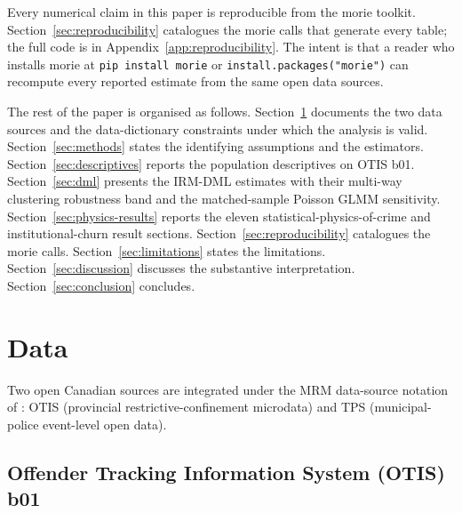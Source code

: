 \documentclass[article,shortnames,nojss]{jss}
\newcommand{\OTIS}{\textsf{OTIS}}
\newcommand{\TPS}{\textsf{TPS}}
\begin{document}
Every numerical claim in this paper is reproducible from the morie
toolkit. Section~\ref{sec:reproducibility} catalogues the morie
calls that generate every table; the full code is in
Appendix~\ref{app:reproducibility}. The intent is that a reader who
installs morie at \texttt{pip install morie} or
\texttt{install.packages("morie")} can recompute every reported
estimate from the same open data sources.

The rest of the paper is organised as follows.
Section~\ref{sec:data} documents the two data sources and the
data-dictionary constraints under which the analysis is valid.
Section~\ref{sec:methods} states the identifying assumptions and the
estimators. Section~\ref{sec:descriptives} reports the population
descriptives on \OTIS{} b01. Section~\ref{sec:dml} presents the IRM-DML
estimates with their multi-way clustering robustness band and the
matched-sample Poisson GLMM sensitivity. Section~\ref{sec:physics-results} reports the eleven
statistical-physics-of-crime and institutional-churn result sections.
Section~\ref{sec:reproducibility} catalogues the morie calls.
Section~\ref{sec:limitations} states the limitations.
Section~\ref{sec:discussion} discusses the substantive interpretation.
Section~\ref{sec:conclusion} concludes.

\section{Data}
\label{sec:data}

Two open Canadian sources are integrated under the MRM data-source
notation of \citet{Ruhela2026MRM}: \OTIS{} (provincial restrictive-confinement
microdata) and \TPS{} (municipal-police event-level open data).

\subsection[Offender Tracking Information System (OTIS) b01]{Offender Tracking Information System (\OTIS{}) b01}
\label{sec:data-otis}
\end{document}
